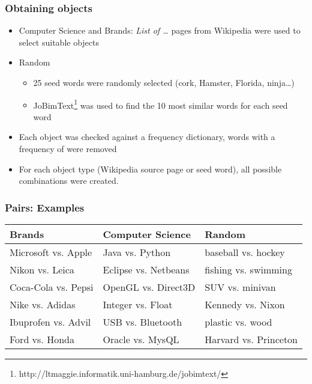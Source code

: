 \documentclass[11pt,aspectratio=169]{beamer}
\begin{document}
    \begin{frame}
        \frametitle{Obtaining objects}
        \begin{itemize}
            \item Computer Science and Brands: \emph{List of \ldots} pages from Wikipedia were used to select suitable objects
            \item Random
            \begin{itemize}
                \item 25 seed words were randomly selected (cork, Hamster, Florida, ninja\ldots)
                \item JoBimText\footnote{http://ltmaggie.informatik.uni-hamburg.de/jobimtext/} was used to find the 10 most similar words for each seed word
            \end{itemize}
            \item Each object was checked against a frequency dictionary, words with a frequency of were removed
            \item For each object type (Wikipedia source page or seed word), all possible combinations were created.
        \end{itemize}

    \end{frame}

    \begin{frame}
      \frametitle{Pairs: Examples}

      \begin{tabularx}{\textwidth}{XXX}
          \toprule
          Brands & Computer Science & Random \\
          \midrule
          Microsoft vs. Apple & Java vs. Python & baseball vs. hockey \\
          Nikon vs. Leica & Eclipse vs. Netbeans & fishing vs. swimming\\
          Coca-Cola vs. Pepsi & OpenGL vs. Direct3D & SUV vs. minivan\\
          Nike vs. Adidas & Integer vs. Float & Kennedy vs. Nixon\\
          Ibuprofen vs. Advil & USB vs. Bluetooth & plastic vs. wood\\
          Ford vs. Honda & Oracle vs. MysQL & Harvard vs. Princeton\\

          \bottomrule

      \end{tabularx}

    \end{frame}
\end{document}
